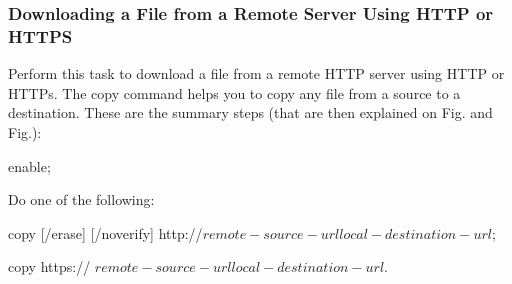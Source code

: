 \subsubsection{Downloading a File from a Remote Server Using HTTP or HTTPS}
Perform this task to download a file from a remote HTTP server using HTTP or HTTPs. The copy command helps you to copy any file from a source to a destination. These are the summary steps (that are then explained on Fig. and Fig.):

\begin{enumerate-c}
\item enable;
\item Do one of the following:
	\begin{item-c}
	\item copy [/erase] [/noverify] http://$remote-source-urllocal-destination-url$;
	\item copy https:// $remote-source-url local-destination-url$.
	\end{item-c}
\end{enumerate-c}

